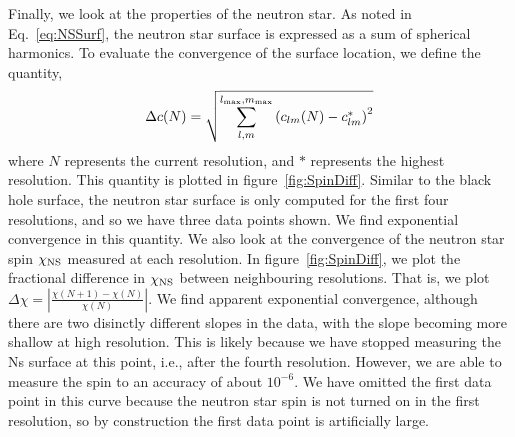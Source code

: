 Finally, we look at the properties of the neutron star. As noted in Eq.~\ref{eq:NSSurf},
the neutron star surface is expressed as a sum of spherical
harmonics.
To evaluate the convergence of the surface location, we define the
quantity,
\begin{equation}
\label{eq:NSSurf2}
\Delta c(N)=\sqrt{\sum_{l,m}^{l_{\rm max},m_{\rm max}}\left(c_{lm}(N)-c^{*}_{lm}\right)^2}
\end{equation}
where $N$ represents the current resolution, and $*$ represents the
highest resolution. This quantity is plotted in
figure~\ref{fig:SpinDiff}. Similar to the black hole surface, the
neutron star surface is only computed for the first four resolutions,
and so we have three data points shown. We find exponential
convergence in this quantity. We also look at the convergence of the
neutron star spin $\chi_{\rm NS}$ measured at each resolution. In
figure~\ref{fig:SpinDiff}, we plot the fractional difference in
$\chi_{\rm NS}$ between neighbouring resolutions. That is, we plot
$
\Delta\chi=|\frac{\chi(N+1)-\chi(N)}{\chi(N)}|.
$
 We find apparent
exponential convergence, although there are two disinctly different
slopes in the data, with the slope becoming more shallow at high
resolution. This is likely because we have stopped measuring the Ns
surface at this point, i.e., after the fourth resolution. However, we are able to measure the spin to an
accuracy of about $10^{-6}$. 
 We have omitted the first data point in this curve
because the neutron star spin is not turned on in the first
resolution, so by construction the first data point is artificially large.

